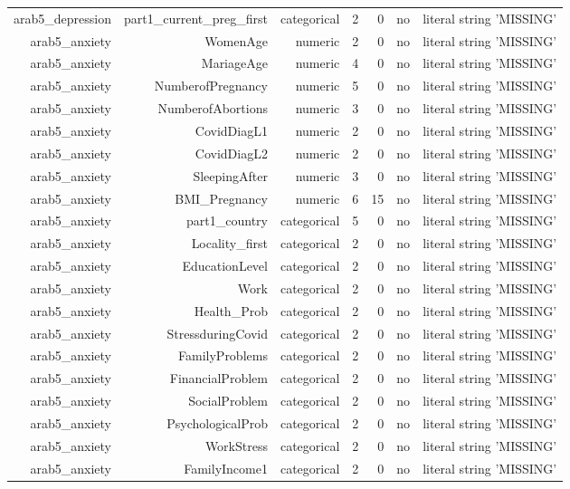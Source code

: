 \documentclass[10pt]{article}
\begin{document}
\begin{longtable}{rrrrrrr}
arab5\_depression & part1\_current\_preg\_first & categorical & 2 & 0 & no & literal string 'MISSING' \\
arab5\_anxiety & WomenAge & numeric & 2 & 0 & no & literal string 'MISSING' \\
arab5\_anxiety & MariageAge & numeric & 4 & 0 & no & literal string 'MISSING' \\
arab5\_anxiety & NumberofPregnancy & numeric & 5 & 0 & no & literal string 'MISSING' \\
arab5\_anxiety & NumberofAbortions & numeric & 3 & 0 & no & literal string 'MISSING' \\
arab5\_anxiety & CovidDiagL1 & numeric & 2 & 0 & no & literal string 'MISSING' \\
arab5\_anxiety & CovidDiagL2 & numeric & 2 & 0 & no & literal string 'MISSING' \\
arab5\_anxiety & SleepingAfter & numeric & 3 & 0 & no & literal string 'MISSING' \\
arab5\_anxiety & BMI\_Pregnancy & numeric & 6 & 15 & no & literal string 'MISSING' \\
arab5\_anxiety & part1\_country & categorical & 5 & 0 & no & literal string 'MISSING' \\
arab5\_anxiety & Locality\_first & categorical & 2 & 0 & no & literal string 'MISSING' \\
arab5\_anxiety & EducationLevel & categorical & 2 & 0 & no & literal string 'MISSING' \\
arab5\_anxiety & Work & categorical & 2 & 0 & no & literal string 'MISSING' \\
arab5\_anxiety & Health\_Prob & categorical & 2 & 0 & no & literal string 'MISSING' \\
arab5\_anxiety & StressduringCovid & categorical & 2 & 0 & no & literal string 'MISSING' \\
arab5\_anxiety & FamilyProblems & categorical & 2 & 0 & no & literal string 'MISSING' \\
arab5\_anxiety & FinancialProblem & categorical & 2 & 0 & no & literal string 'MISSING' \\
arab5\_anxiety & SocialProblem & categorical & 2 & 0 & no & literal string 'MISSING' \\
arab5\_anxiety & PsychologicalProb & categorical & 2 & 0 & no & literal string 'MISSING' \\
arab5\_anxiety & WorkStress & categorical & 2 & 0 & no & literal string 'MISSING' \\
arab5\_anxiety & FamilyIncome1 & categorical & 2 & 0 & no & literal string 'MISSING' \\

\end{longtable}
\end{document}
